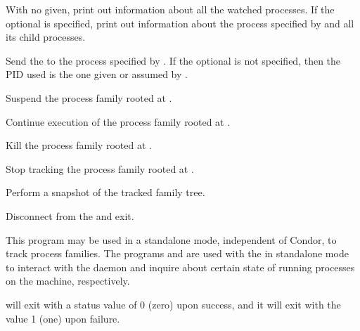 \begin{ManPage}
\begin{Options}
  {With no  given, print out information about all 
  the watched processes.  
  If the optional  is specified,
  print out information about the process specified by  
  and all its child processes.}

  {Send the  to the process specified by .
  If the optional  is not specified, 
  then the PID used is the one given or assumed by .}

  {Suspend the process family rooted at .}

  {Continue execution of the process family rooted at .}

  {Kill the process family rooted at .}

  {Stop tracking the process family rooted at .}

  {Perform a snapshot of the tracked family tree.}

  {Disconnect from the  and exit.}

\end{Options}
	

\GenRem

This program may be used in a standalone mode, independent of
Condor, to track process families. The programs  and
 are used with the  in standalone mode
to interact with the daemon and inquire about certain state of running
processes on the machine, respectively.

\ExitStatus

 will exit with a status value of 0 (zero) upon success,
and it will exit with the value 1 (one) upon failure.

\end{ManPage}
